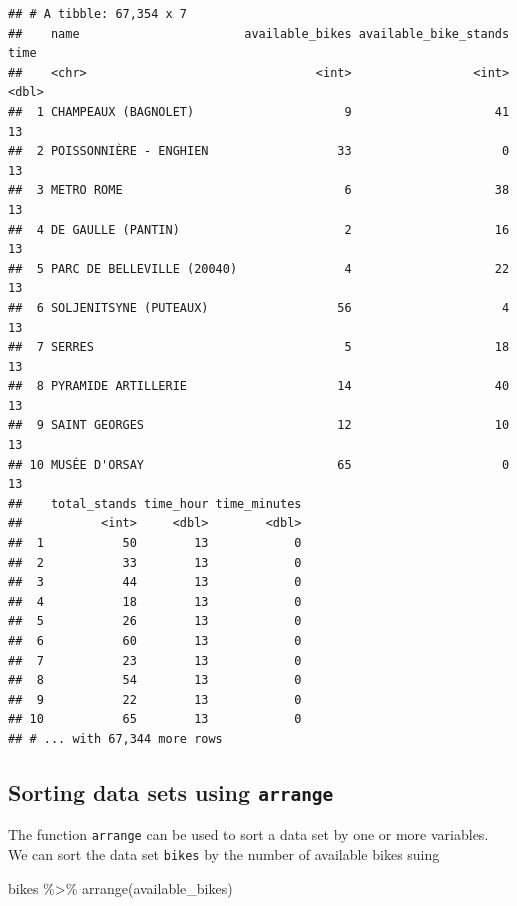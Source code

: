\documentclass[
]{book}
\newenvironment{Shaded}{\begin{snugshade}}{\end{snugshade}}
\newcommand{\FunctionTok}[1]{\textcolor[rgb]{0.00,0.00,0.00}{#1}}
\newcommand{\NormalTok}[1]{#1}
\newcommand{\SpecialCharTok}[1]{\textcolor[rgb]{0.00,0.00,0.00}{#1}}
\begin{document}
\begin{verbatim}
## # A tibble: 67,354 x 7
##    name                       available_bikes available_bike_stands  time
##    <chr>                                <int>                 <int> <dbl>
##  1 CHAMPEAUX (BAGNOLET)                     9                    41    13
##  2 POISSONNIÈRE - ENGHIEN                  33                     0    13
##  3 METRO ROME                               6                    38    13
##  4 DE GAULLE (PANTIN)                       2                    16    13
##  5 PARC DE BELLEVILLE (20040)               4                    22    13
##  6 SOLJENITSYNE (PUTEAUX)                  56                     4    13
##  7 SERRES                                   5                    18    13
##  8 PYRAMIDE ARTILLERIE                     14                    40    13
##  9 SAINT GEORGES                           12                    10    13
## 10 MUSÉE D'ORSAY                           65                     0    13
##    total_stands time_hour time_minutes
##           <int>     <dbl>        <dbl>
##  1           50        13            0
##  2           33        13            0
##  3           44        13            0
##  4           18        13            0
##  5           26        13            0
##  6           60        13            0
##  7           23        13            0
##  8           54        13            0
##  9           22        13            0
## 10           65        13            0
## # ... with 67,344 more rows
\end{verbatim}

\hypertarget{sorting-data-sets-using-arrange}{%
\subsection{\texorpdfstring{Sorting data sets using \texttt{arrange}}{Sorting data sets using arrange}}\label{sorting-data-sets-using-arrange}}

The function \texttt{arrange} can be used to sort a data set by one or more variables.
We can sort the data set \texttt{bikes} by the number of available bikes suing

\begin{Shaded}
\begin{Highlighting}[]
\NormalTok{bikes }\SpecialCharTok{\%\textgreater{}\%}
  \FunctionTok{arrange}\NormalTok{(available\_bikes)}
\end{Highlighting}
\end{Shaded}
\end{document}
